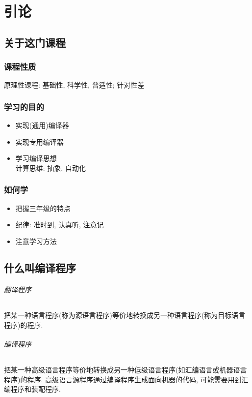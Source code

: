 \chapter{引论}

\section{关于这门课程}
    
    \subsection{课程性质}

        原理性课程: 基础性, 科学性, 普适性; 针对性差

    \subsection{学习的目的}

        \begin{itemize}
            \item 实现(通用)编译器
            \item 实现专用编译器
            \item 学习编译思想 \\
                计算思维: 抽象, 自动化
        \end{itemize}

    \subsection{如何学}

        \begin{itemize}
            \item 把握三年级的特点
            \item 纪律: 准时到, 认真听, 注意记
            \item 注意学习方法
        \end{itemize}

\section{什么叫编译程序}

    \subparagraph{翻译程序}    把某一种语言程序(称为\textsf{源语言程序})等价地转换成另一种语言程序(称为\textsf{目标语言程序})的程序.

    \subparagraph{编译程序}    把某一种高级语言程序等价地转换成另一种低级语言程序(如汇编语言或机器语言程序)的程序. 高级语言源程序通过编译程序生成面向机器的代码, 可能需要用到汇编程序和装配程序.


